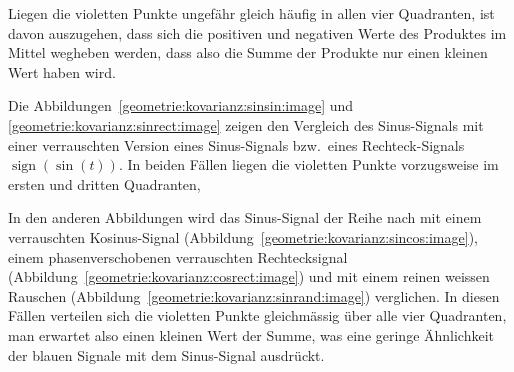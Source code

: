 Liegen die violetten Punkte ungefähr gleich häufig in allen vier Quadranten,
ist davon auszugehen, dass sich die positiven und negativen Werte des
Produktes im Mittel wegheben werden, dass also die Summe der
Produkte nur einen kleinen Wert haben wird.

Die Abbildungen~\ref{geometrie:kovarianz:sinsin:image} und
\ref{geometrie:kovarianz:sinrect:image} zeigen den Vergleich
des Sinus-Signals mit einer verrauschten Version eines Sinus-Signals
bzw.~eines Rechteck-Signals $\operatorname{sign}(\sin(t))$.
In beiden Fällen liegen die violetten Punkte vorzugsweise im ersten
und dritten Quadranten, 

In den anderen Abbildungen
wird das Sinus-Signal der Reihe nach mit einem verrauschten
Kosinus-Signal (Abbildung~\ref{geometrie:kovarianz:sincos:image}),
einem phasenverschobenen verrauschten Rechtecksignal
(Abbildung~\ref{geometrie:kovarianz:cosrect:image})
und mit einem reinen weissen Rauschen
(Abbildung~\ref{geometrie:kovarianz:sinrand:image})
verglichen.
In diesen Fällen verteilen sich die violetten Punkte gleichmässig
über alle vier Quadranten, man erwartet also einen kleinen Wert
der Summe, was eine geringe Ähnlichkeit der blauen Signale mit dem
Sinus-Signal ausdrückt.


